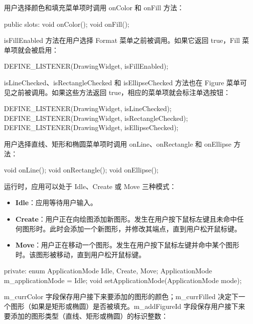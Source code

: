 用户选择颜色和填充菜单项时调用 onColor 和 onFill 方法：

\begin{codebox}
  public slots:
    void onColor();
    void onFill();
\end{codebox}

isFillEnabled 方法在用户选择 Format 菜单之前被调用。如果它返回 true，Fill 菜单项就会被启用：

\begin{codebox}
    DEFINE_LISTENER(DrawingWidget, isFillEnabled);
\end{codebox}

isLineChecked、isRectangleChecked 和 isEllipseChecked 方法也在 Figure 菜单可见之前被调用。如果这些方法返回 true，相应的菜单项就会标注单选按钮：

\begin{codebox}
    DEFINE_LISTENER(DrawingWidget, isLineChecked);
    DEFINE_LISTENER(DrawingWidget, isRectangleChecked);
    DEFINE_LISTENER(DrawingWidget, isEllipseChecked);
\end{codebox}

用户选择直线、矩形和椭圆菜单项时调用 onLine、onRectangle 和 onEllipse 方法：

\begin{codebox}
    void onLine();
    void onRectangle();
    void onEllipse();
\end{codebox}

运行时，应用可以处于 Idle、Create 或 Move 三种模式：

\begin{itemize}
\item \textbf{Idle}：应用等待用户输入。
\item \textbf{Create}：用户正在向绘图添加新图形。发生在用户按下鼠标左键且未命中任何图形时。此时会添加一个新图形，并修改其端点，直到用户松开鼠标键。
\item \textbf{Move}：用户正在移动一个图形。发生在用户按下鼠标左键并命中某个图形时。该图形被移动，直到用户松开鼠标键。
\end{itemize}

\begin{codebox}
  private:
    enum ApplicationMode {Idle, Create, Move};
    ApplicationMode m_applicationMode = Idle;
    void setApplicationMode(ApplicationMode mode);
\end{codebox}

m\_currColor 字段保存用户接下来要添加的图形的颜色；m\_currFilled 决定下一个图形（如果是矩形或椭圆）是否被填充。m\_addFigureId 字段保存用户接下来要添加的图形类型（直线、矩形或椭圆）的标识整数：

